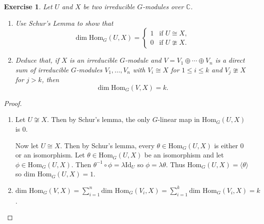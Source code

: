 \documentclass{article}
\newtheorem{exercise}[theorem]{Exercise}
\begin{document}
\begin{exercise}
     Let \( U \) and \( X \) be two irreducible \( G \)-modules over \( \mathbb{C} \).
    \begin{enumerate}
        \item[(a)] Use Schur's Lemma to show that
        \[
        \dim \mathrm{Hom}_G(U, X) =
        \begin{cases}
        1 & \text{if } U \cong X, \\
        0 & \text{if } U \ncong X.
        \end{cases}
        \]
        \item[(b)] Deduce that, if \( X \) is an irreducible \( G \)-module and \( V = V_1 \oplus \cdots \oplus V_n \) is a direct sum of irreducible \( G \)-modules \( V_1, \dots, V_n \) with \( V_i \cong X \) for \( 1 \leq i \leq k \) and \( V_j \ncong X \) for \( j > k \), then
        \[
        \dim \mathrm{Hom}_G(V, X) = k.
        \]
    \end{enumerate}
\end{exercise}

\begin{proof}
\begin{enumerate}
    \item[(a)] Let $U\not\cong X$. Then by Schur's lemma, the only $G$-linear map in $\text{Hom}_G(U,X)$ is $0$.

    Now let $U\cong X$. Then by Schur's lemma, every $\theta\in \text{Hom}_G(U,X)$ is either $0$ or an isomorphism. Let $\theta\in \text{Hom}_G(U,X)$ be an isomorphism and let $\phi\in \text{Hom}_G(U,X)$. Then $\theta^{-1}\circ\phi=\lambda\text{Id}_U$ so $\phi=\lambda\theta$. Thus $\text{Hom}_G(U,X)=\langle\theta\rangle$ so $\text{dim Hom}_G(U,X)=1$.
    \item[(b)]  $\text{dim Hom}_G(V,X)=\sum_{i=1}^n\text{dim Hom}_G(V_i,X)=\sum_{i=1}^k\text{dim Hom}_G(V_i,X)=k$.
\end{enumerate}
\end{proof}
\end{document}
